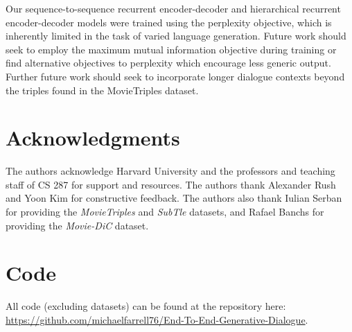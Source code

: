 \documentclass[11pt]{article}
\begin{document}
\noindent Our sequence-to-sequence recurrent encoder-decoder and hierarchical recurrent encoder-decoder models were trained using the perplexity objective, which is inherently limited in the task of varied language generation. Future work should seek to employ the maximum mutual information objective during training or find alternative objectives to perplexity which encourage less generic output. Further future work should seek to incorporate longer dialogue contexts beyond the triples found in the MovieTriples dataset.

\section{Acknowledgments}

The authors acknowledge Harvard University and the professors and teaching staff of CS 287 for support and resources. The authors thank Alexander Rush and Yoon Kim for constructive feedback. The authors also thank Iulian Serban for providing the {\it MovieTriples} and {\it SubTle} datasets, and Rafael Banchs for providing the {\it Movie-DiC} dataset.

\section{Code}

All code (excluding datasets) can be found at the repository here: \\ \href{https://github.com/michaelfarrell76/End-To-End-Generative-Dialogue}{\color{red} https://github.com/michaelfarrell76/End-To-End-Generative-Dialogue}.

\printbibliography
\end{document}
